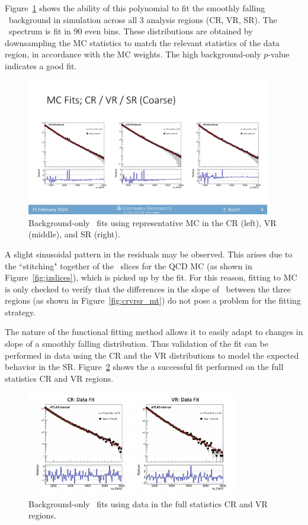 Figure~\ref{fig:bkgfit_mc} shows the ability of this polynomial to fit the smoothly falling \mt~background in simulation across all 3 analysis regions (CR, VR, SR).
The \mt~spectrum is fit in 90 even bins.
These distributions are obtained by downsampling the MC statistics to match the relevant statistics of the data region, in accordance with the MC weights.
The high background-only $p$-value indicates a good fit.
\begin{figure}[!htbp]
\centering
   \includegraphics[width=0.95\textwidth]{figures/stats/bkgfit_mc}
    \caption{Background-only \mt~fits using representative MC in the CR (left), VR (middle), and SR (right).
    \label{fig:bkgfit_mc}}
\end{figure}

A slight sinusoidal pattern in the residuals may be observed. 
This arises due to the ``stitching" together of the \pt~slices for the QCD MC (as shown in Figure~\ref{fig:jzslices}), which is picked up by the fit.
For this reason, fitting to MC is only checked to verify that the differences in the slope of \mt~between the three regions (as shown in Figure~\ref{fig:crvrsr_mt}) do not pose a problem for the fitting strategy.

The nature of the functional fitting method allows it to easily adapt to changes in slope of a smoothly falling distribution.
Thus validation of the fit can be performed in data using the CR and the VR distributions to model the expected behavior in the SR. 
Figure~\ref{fig:bkgfit_data_fullstats} shows the a successful fit performed on the full statistics CR and VR regions.
\begin{figure}[!htbp]
\centering
   \includegraphics[width=0.82\textwidth]{figures/stats/bkgfit_data_fullstats}
    \caption{Background-only \mt~fits using data in the full statistics CR and VR regions.
    \label{fig:bkgfit_data_fullstats}}
\end{figure}

